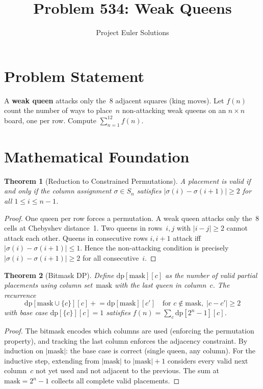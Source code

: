 \documentclass[11pt]{article}
\title{Problem 534: Weak Queens}
\author{Project Euler Solutions}
\date{}
\newtheorem{theorem}{Theorem}
\begin{document}
\maketitle

\section{Problem Statement}

A \textbf{weak queen} attacks only the~8 adjacent squares (king moves). Let $f(n)$ count the number of ways to place~$n$ non-attacking weak queens on an $n\times n$ board, one per row. Compute $\sum_{n=1}^{12} f(n)$.

\section{Mathematical Foundation}

\begin{theorem}[Reduction to Constrained Permutations]
A placement is valid if and only if the column assignment $\sigma \in S_n$ satisfies $|\sigma(i)-\sigma(i+1)|\ge 2$ for all $1\le i\le n-1$.
\end{theorem}

\begin{proof}
One queen per row forces a permutation. A weak queen attacks only the~8 cells at Chebyshev distance~1. Two queens in rows~$i,j$ with $|i-j|\ge 2$ cannot attack each other. Queens in consecutive rows $i,i+1$ attack iff $|\sigma(i)-\sigma(i+1)|\le 1$. Hence the non-attacking condition is precisely $|\sigma(i)-\sigma(i+1)|\ge 2$ for all consecutive~$i$.
\end{proof}

\begin{theorem}[Bitmask DP]
Define $\mathrm{dp}[\mathrm{mask}][c]$ as the number of valid partial placements using column set~$\mathrm{mask}$ with the last queen in column~$c$. The recurrence
\[
\mathrm{dp}[\mathrm{mask}\cup\{c\}][c] \mathrel{+}= \mathrm{dp}[\mathrm{mask}][c'] \quad\text{for } c\notin\mathrm{mask},\;|c-c'|\ge 2
\]
with base case $\mathrm{dp}[\{c\}][c] = 1$ satisfies $f(n) = \sum_c \mathrm{dp}[2^n-1][c]$.
\end{theorem}

\begin{proof}
The bitmask encodes which columns are used (enforcing the permutation property), and tracking the last column enforces the adjacency constraint. By induction on $|\mathrm{mask}|$: the base case is correct (single queen, any column). For the inductive step, extending from $|\mathrm{mask}|$ to $|\mathrm{mask}|+1$ considers every valid next column~$c$ not yet used and not adjacent to the previous. The sum at $\mathrm{mask} = 2^n-1$ collects all complete valid placements.
\end{proof}
\end{document}

